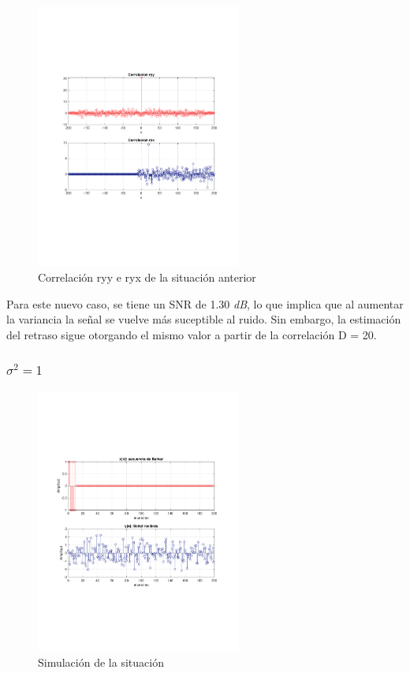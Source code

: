 			\begin{figure}[H]
			\center
			\includegraphics[width=0.6\textwidth,clip, trim = {2cm 7.0cm 2.2cm 7.0cm}]{../imgs/4_radar_d_0_1_corre.pdf}
			\caption{Correlación ryy e ryx de la situación anterior}
			\label{fig:radar_d_0_1_corre}
		\end{figure}
		
		Para este nuevo caso, se tiene un SNR de 1.30 \textit{dB}, lo que implica que al aumentar la variancia la señal se vuelve más suceptible al ruido. Sin embargo, la estimación del retraso sigue otorgando el mismo valor a partir de la correlación D = 20.
		
		\subsubsection{$\sigma^{2} = 1$}
	 		\begin{figure}[H]
			\center
			\includegraphics[width=0.6\textwidth,clip, trim = {2cm 7.0cm 2.2cm 7.0cm}]{../imgs/4_radar_d_1_signal.pdf}
			\caption{Simulación de la situación}
			\label{fig:radar_d_1_sim}
			\end{figure}	
			

